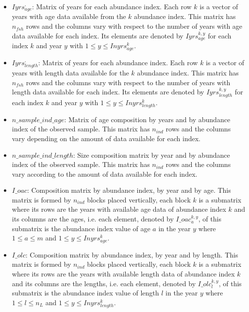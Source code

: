 \documentclass{article}
\begin{document}
\begin{itemize}
    \item $Iyrs^{,}_{age}$: Matrix of years for each abundance index. Each row $k$ is a vector of years with age data available from the $k$ abundance index. This matrix has $n_{fsh}$ rows and the columns vary with respect to the number of years with age data available for each index. Its elements are denoted by $Iyrs^{k,y}_{age}$ for each index $k$ and year $y$ with $1\leq y \leq Inyrs^k_{age}$.
     \item $Iyrs^{,}_{length}$:    Matrix of years for each abundance index. Each row $k$ is a vector of years with length data available for the $k$ abundance index. This matrix has $n_{fsh}$ rows and the columns vary with respect to the number of years with length data available for each index. Its elements are denoted by $Iyrs^{k,y}_{length}$ for each index $k$ and year $y$ with $1\leq y \leq Inyrs^k_{length}$.
     \item $n\_sample\_ind\_age$:  Matrix of age composition by years and by abundance index of the observed sample. This matrix has $n_{ind}$ rows and the columns vary depending on the amount of data available for each index.
    \item $n\_sample\_ind\_length$:   Size composition matrix by year and by abundance index of the observed sample. This matrix has $n_{ind}$ rows and the columns vary according to the amount of data available for each index.
    \item $I\_oac$: Composition matrix by abundance index, by year and by age.  This matrix is formed by $n_{ind}$ blocks placed vertically, each block $k$ is a submatrix where its rows are the years with available age data of abundance index $k$ and its columns are the ages, i.e. each element, denoted by $I\_oac^{k,y}_a$, of this submatrix is the abundance index value of age $a$ in the year $y$ where $1\leq a \leq m$ and $1\leq y \leq Inyrs^k_{age}$.
    \item $I\_olc$: Composition matrix by abundance index, by year and by length.  This matrix is formed by $n_{ind}$ blocks placed vertically, each block $k$ is a submatrix where its rows are the years with available length data of abundance index $k$ and its columns are the lengths, i.e. each element, denoted by $I\_olc^{k,y}_l$, of this submatrix is the abundance index value of length $l$ in the year $y$ where $1\leq l \leq n_L$ and $1\leq y \leq Inyrs^k_{length}$.

\end{itemize}
\end{document}
